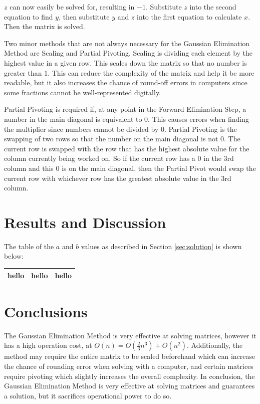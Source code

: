 \documentclass[12pt, letterpaper]{article}
\begin{document}
	$z$ can now easily be solved for, resulting in $-1$. Substitute $z$ into the second equation to find $y$, then substitute $y$ and $z$ into the first equation to calculate $x$. Then the matrix is solved.
	\vspace{\baselineskip}
	
	Two minor methods that are not always necessary for the Gaussian Elimination Method are Scaling and Partial Pivoting. Scaling is dividing each element by the highest value in a given row. This scales down the matrix so that no number is greater than 1. This can reduce the complexity of the matrix and help it be more readable, but it also increases the chance of round-off errors in computers since some fractions cannot be well-represented digitally. 
	
	Partial Pivoting is required if, at any point in the Forward Elimination Step, a number in the main diagonal is equivalent to 0. This causes errors when finding the multiplier since numbers cannot be divided by 0. Partial Pivoting is the swapping of two rows so that the number on the main diagonal is not 0. The current row is swapped with the row that has the highest absolute value for the column currently being worked on. So if the current row has a 0 in the 3rd column and this 0 is on the main diagonal, then the Partial Pivot would swap the current row with whichever row has the greatest absolute value in the 3rd column.


\section{\label{sec:results}Results and Discussion}
    	The table of the $a$ and $b$ values as described in Section \ref{sec:solution} is shown below:\vspace{\baselineskip}
	
	\begin{center}
	\begin{tabular}{|c|c|c|}
		\hline
		hello & hello & hello \\
		\hline
	\end{tabular}
	\end{center}


\section{\label{conclusion}Conclusions}
	The Gaussian Elimination Method is very effective at solving matrices, however it has a high operation cost, at $O(n)=O(\frac{2}{3}n^3) + O(n^2)$. Additionally, the method may require the entire matrix to be scaled beforehand which can increase the chance of rounding error when solving with a computer, and certain matrices require pivoting which slightly increases the overall complexity. In conclusion, the Gaussian Elimination Method is very effective at solving matrices and guarantees a solution, but it sacrifices operational power to do so. 
\end{document}
